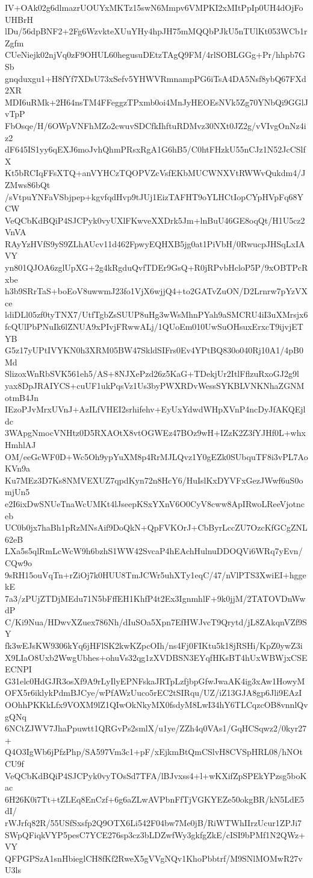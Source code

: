 IV+OAk02g6dlmazrUOUYxMKTz15swN6Mmpv6VMPKI2xMItPpIp0UH4dOjFoUHBrH
lDu/56dpBNF2+2Fg6WzvkteXUuYHy4hpJH75mMQQbPJkU5nTUlKt053WCb1rZgfm
CUeNiejk02njVq0zF9OHUL60hegusuDEtzTAgQ9FM/4rlSOBLGGg+Pr/hhpb7GSb
gnqduxgu1+H8fYf7XDsU73xSefv5YHWVRmnampPG6iTsA4DA5Nsf8ybQ67FXd2XR
MDI6uRMk+2H64nsTM4FFeggzTPxmb0oi4MnJyHEOEsNVk5Zg70YNbQi9GGlJvTpP
FbOsqe/H/6OWpVNFhMZo2cwuvSDCfkIhftuRDMvz30NXt0JZ2g/vVIvgOnNz4iz2
dF645IS1yy6qEXJ6moJvhQhmPRsxRgA1G6hB5/C0htFHzkU55nCJz1N52JcCSlfX
Kt5bRCIqFFsXTQ+anVYHCzTQOPVZcVsfEKbMUCWNXVtRWWvQukdm4/JZMws86bQt
/sVtpuYNFaVSbjpep+kgvfqdHvp9tJUj1EizTAFHT9oYLHCtIopCYpHVpFq68YCW
VeQCbKdBQiP4SJCPyk0vyUXlFKwveXXDrk5Jm+lnBuU46GE8oqQt/H1U5cz2VnVA
RAyYzHVfS9yS9ZLhAUcv11d462FpwyEQHXB5jg0at1PiVbH/0RwucpJHSqLxIAVY
yn801QJOA6zglUpXG+2g4kRgduQvfTDEr9GsQ+R0jRPvbHcloP5P/9xOBTPcRxbe
h3b9SRrTaS+boEoV8uwwmJ23fo1VjX6wjjQ4+to2GATvZuON/D2Lrnrw7pYzVXce
ldiDLl05zf0tyTNX7/UtfTgbZsSUUP8uHg3wWsMhnPYah9aSMCRU4iI3uXMrsjx6
fcQUlPbPNuIk6lZNUA9xPIvjFRwwALj/1QUoEm010UwSuOHsuxErxcT9ijvjETYB
G5z17yUPtIVYKN0h3XRM05BW47SkldSIFrs0Ev4YPtBQ830o040Rj10A1/4pB0Md
SlizoxWnRbSVK561eh5/AS+8NJXePzd26z5KaG+TDekjUr2ItlFflzuRxoGJ2g9l
yax8DpJRAIYCS+cuUF1ukPqsVz1Us3byPWXRDvWessSYKBLVNKNhaZGNMotmB4Jn
IEzoPJvMrxUVnJ+AzILfVHEI2srhifehv+EyUxYdwdWHpXVnP4ncDyJfAKQEjldc
3WApgNmocVNHtz0D5RXAOtX8vtOGWEz47BOz9wH+IZzK2Z3fYJHf0L+whxHmhlAJ
OM/eeGcWF0D+Wc5Oh9ypYuXM8p4RrMJLQvz1Y0gEZk0SUbquTF8i3vPL7AoKVn9a
Ku7MEz3D7Ks8NMVEXUZ7qpdKyn72n8HcY6/HuIslKxDYVFxGezJWwf6uS0omjUn5
e2I6ixDwSNUeTnaWcUMKt4lJseepKSxYXnV6O0CyV8cww8ApIRwoLReeVjotnceb
UC0b0jx7haBh1pRzMNsAif9DoQkN+QpFVKOrJ+CbByrLccZU7OzcKfGCgZNL62eB
LXa5s5qlRmLcWcW9h6bzhS1WW42SvcaP4hEAchHulnuDDOQVi6WRq7yEvn/CQw9o
9sRH15ouVqTn+rZiOj7k0HUU8TmJCWr5uhXTy1eqC/47/nVlPTS3XwiEI+hggekE
7a3/zPUjZTDjMEdu71N5bFffEH1KhfP4t2Ex3IgnmhlF+9k0jjM/2TATOVDnWwdP
C/Ki9Nua/HDwvXZuex786Nh/dIuSOa5Xpn7EfHWJvcT9Qrytd/jL8ZAkqnVZf9SY
fk3wEJsKW9306kYq6jHFlSK2kwKZpcOIh/ns4Fj0FIKtu5k18jRSHi/KpZ0ywZ3i
X9LIaO8Uxb2WwgUbhes+ohuVs32qg1zXVDBSN3EYqfHKsBT4hUxWBWjxCSEECNPI
G31elc0HdGJR3osXf9A9rLyIlyEPNFskaJRTpLzfjbpGfwJwaAK4ig3xAw1HowyM
OFX5r6iklykPdmBJCye/wPfAWzUuco5rEC2tSIRqu/UZ/iZ13GJA8gp6Jli9EAzI
OOhhPKKkLfx9VOXM9lZ1QIwOkNkyMX0fsdyM8LwI34hY6TLCqzcOB8vnnlQvgQNq
6NCtZJWV7JhaPpuwtt1QRGvPs2smlX/u1ye/ZZh4q0VAs1/GqHCSqwz2/0kyr27+
Q4O3IgWb6jPfzPhp/SA597Vm3c1+pF/xEjkmBtQmCSlvH8CVSpHRL08/hNOtCU9f
VeQCbKdBQiP4SJCPyk0vyTOsSd7TFA/lBJvxss4+l+wKXifZpSPEkYPzsg5boKac
6H26K0i7Tt+tZLEq8EnCzf+6g6aZLwAVPbnFfTjVGKYEZe50okgBR/kN5LdE5dI/
rWJrfq82R/55USfSxsfp2Q9OTX6Li542F04bw7Me0jB/RiWTWhIIrzUcur1ZPJi7
SWpQFiqkVYP5pesC7YCE276sp3cz3bLDZwfWy3gkfgZkE/cISI9bPMf1N2QWz+VY
QFPGPSzA1snHbieglCH8fKf2RweX5gVVgNQv1KhoPbbtrf/M9SNlMOMwR27vU3ls
